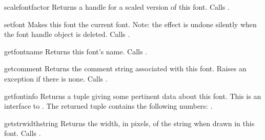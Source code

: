\renewcommand{\indexsubitem}{(font handle method)}
\begin{funcdesc}{scalefont}{factor}
Returns a handle for a scaled version of this font.
Calls .
\end{funcdesc}

\begin{funcdesc}{setfont}{}
Makes this font the current font.
Note: the effect is undone silently when the font handle object is
deleted.
Calls .
\end{funcdesc}

\begin{funcdesc}{getfontname}{}
Returns this font's name.
Calls .
\end{funcdesc}

\begin{funcdesc}{getcomment}{}
Returns the comment string associated with this font.
Raises an exception if there is none.
Calls .
\end{funcdesc}

\begin{funcdesc}{getfontinfo}{}
Returns a tuple giving some pertinent data about this font.
This is an interface to .
The returned tuple contains the following numbers:
.
\end{funcdesc}

\begin{funcdesc}{getstrwidth}{string}
Returns the width, in pixels, of the string when drawn in this font.
Calls .
\end{funcdesc}
